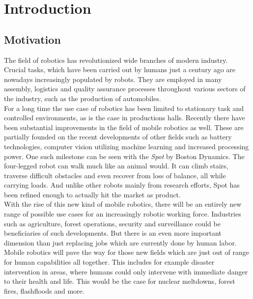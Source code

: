 \chapter{Introduction} \label{chap:introduction}

\section{Motivation} \label{sec:motivation}

The field of robotics has revolutionized wide branches of modern industry. Crucial tasks, which have been carried out by humans just a century ago are nowadays increasingly populated by robots. They are employed in many assembly, logistics and quality assurance processes throughout various sectors of the industry, such as the production of automobiles.\\
For a long time the use case of robotics has been limited to stationary task and controlled environments, as is the case in productions halls. Recently there have been substantial improvements in the field of mobile robotics as well. These are partially founded on the recent developments of other fields such as battery technologies, computer vision utilizing machine learning and increased processing power. One such milestone can be seen with the \textit{Spot}\textsuperscript{\textregistered} by Boston Dynamics.\cite{spot} The four-legged robot can walk much like an animal would. It can climb stairs, traverse difficult obstacles and even recover from loss of balance, all while carrying loads. And unlike other robots mainly from research efforts, Spot has been refined enough to actually hit the market as product.\\
With the rise of this new kind of mobile robotics, there will be an entirely new range of possible use cases for an increasingly robotic working force. Industries such as agriculture, forest operations, security and surveillance could be beneficiaries of such developments. But there is an even more important dimension than just replacing jobs which are currently done by human labor. Mobile robotics will pave the way for those new fields which are just out of range for human capabilities all together. This includes for example disaster intervention in areas, where humans could only intervene with immediate danger to their health and life. This would be the case for nuclear meltdowns, forest fires, flashfloods and more.\\ \\
